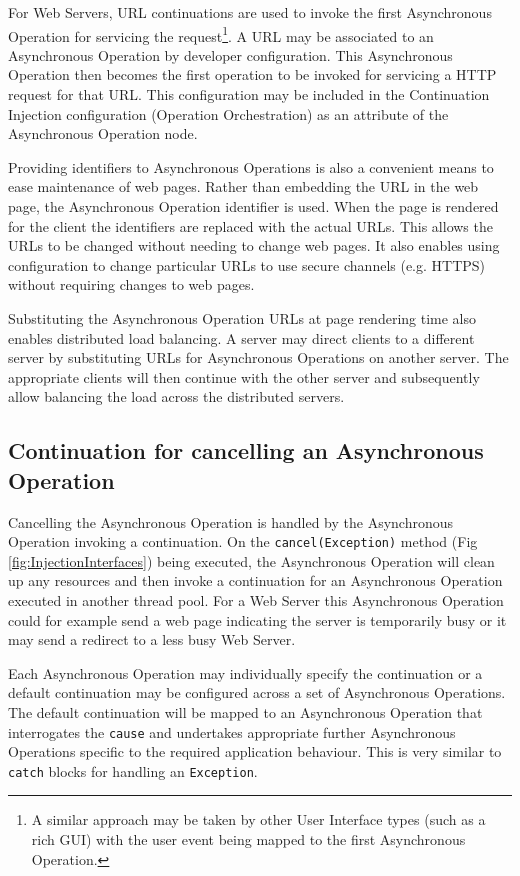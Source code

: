 \documentclass[prodmode]{style/acmlarge}
\begin{document}
For Web Servers, URL continuations \cite{url-continuation} are used to invoke
the first Asynchronous Operation for servicing the request\footnote{A similar
approach may be taken by other User Interface types (such as a rich GUI) with
the user event being mapped to the first Asynchronous Operation.}.  A URL may be
associated to an Asynchronous Operation by developer configuration.  This
Asynchronous Operation then becomes the first operation to be invoked for
servicing a HTTP request for that URL.  This configuration may be included in
the Continuation Injection configuration (Operation Orchestration) as an
attribute of the Asynchronous Operation node.

Providing identifiers to Asynchronous Operations is also a convenient means to
ease maintenance of web pages.  Rather than embedding the URL in the web page,
the Asynchronous Operation identifier is used.  When the page is rendered for
the client the identifiers are replaced with the actual URLs.  This allows the
URLs to be changed without needing to change web pages.  It also enables using
configuration to change particular URLs to use secure channels (e.g. HTTPS)
without requiring changes to web pages.

Substituting the Asynchronous Operation URLs at page rendering time also enables
distributed load balancing.  A server may direct clients to a different server
by substituting URLs for Asynchronous Operations on another server. The
appropriate clients will then continue with the other server and subsequently
allow balancing the load across the distributed servers.


\subsection{Continuation for cancelling an Asynchronous Operation}

Cancelling the Asynchronous Operation is handled by the Asynchronous Operation
invoking a continuation.  On the \texttt{cancel(Exception)} method (Fig
\ref{fig:InjectionInterfaces}) being executed, the Asynchronous Operation will
clean up any resources and then invoke a continuation for an Asynchronous
Operation executed in another thread pool.  For a Web Server this Asynchronous
Operation could for example send a web page indicating the server is temporarily
busy or it may send a redirect to a less busy Web Server.

Each Asynchronous Operation may individually specify the continuation or a
default continuation may be configured across a set of Asynchronous Operations.
The default continuation will be mapped to an Asynchronous Operation that
interrogates the \texttt{cause} and undertakes appropriate further Asynchronous
Operations specific to the required application behaviour.  This is very similar
to \texttt{catch} blocks for handling an \texttt{Exception}.
\end{document}
